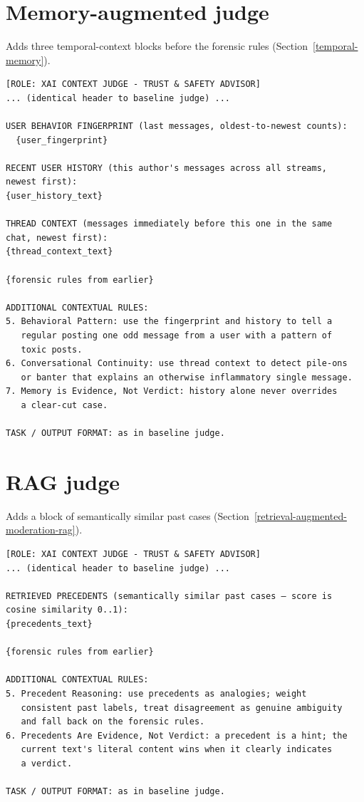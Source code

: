 \section{Memory-augmented judge}\label{memory-augmented-judge}

Adds three temporal-context blocks before the forensic rules (Section~\ref{temporal-memory}).

\begin{verbatim}
[ROLE: XAI CONTEXT JUDGE - TRUST & SAFETY ADVISOR]
... (identical header to baseline judge) ...

USER BEHAVIOR FINGERPRINT (last messages, oldest-to-newest counts):
  {user_fingerprint}

RECENT USER HISTORY (this author's messages across all streams, 
newest first):
{user_history_text}

THREAD CONTEXT (messages immediately before this one in the same 
chat, newest first):
{thread_context_text}

{forensic rules from earlier}

ADDITIONAL CONTEXTUAL RULES:
5. Behavioral Pattern: use the fingerprint and history to tell a 
   regular posting one odd message from a user with a pattern of 
   toxic posts.
6. Conversational Continuity: use thread context to detect pile-ons 
   or banter that explains an otherwise inflammatory single message.
7. Memory is Evidence, Not Verdict: history alone never overrides 
   a clear-cut case.

TASK / OUTPUT FORMAT: as in baseline judge.
\end{verbatim}

\section{RAG judge}\label{rag-judge}

Adds a block of semantically similar past cases (Section~\ref{retrieval-augmented-moderation-rag}).

\begin{verbatim}
[ROLE: XAI CONTEXT JUDGE - TRUST & SAFETY ADVISOR]
... (identical header to baseline judge) ...

RETRIEVED PRECEDENTS (semantically similar past cases — score is 
cosine similarity 0..1):
{precedents_text}

{forensic rules from earlier}

ADDITIONAL CONTEXTUAL RULES:
5. Precedent Reasoning: use precedents as analogies; weight 
   consistent past labels, treat disagreement as genuine ambiguity 
   and fall back on the forensic rules.
6. Precedents Are Evidence, Not Verdict: a precedent is a hint; the 
   current text's literal content wins when it clearly indicates 
   a verdict.

TASK / OUTPUT FORMAT: as in baseline judge.
\end{verbatim}

